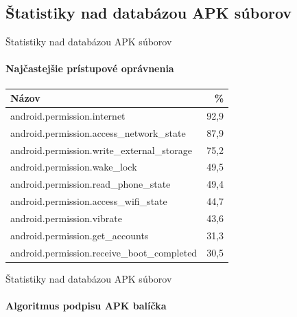 \documentclass{beamer}
\begin{document}
\subsection{Štatistiky nad databázou APK súborov}
  \begin{frame}[label=lists]{Štatistiky nad databázou APK súborov}
  \framesubtitle{Najčastejšie prístupové oprávnenia}
	 \begin{table}[!htbp]
\centering
  \begin{tabular}{l r}
    \textbf{Názov} & \textbf{\%} \\\hline
    android.permission.internet & 92,9 \\
    android.permission.access\_network\_state & 87,9 \\
    android.permission.write\_external\_storage & 75,2 \\
    android.permission.wake\_lock & 49,5 \\
    android.permission.read\_phone\_state & 49,4 \\
    android.permission.access\_wifi\_state & 44,7 \\
    android.permission.vibrate & 43,6 \\
    android.permission.get\_accounts & 31,3 \\
    android.permission.receive\_boot\_completed & 30,5 \\\hline
  \end{tabular}
  \label{tab:permissions}
\end{table}
  \end{frame} 
  
  
  \begin{frame}[label=lists]{Štatistiky nad databázou APK súborov}
  \framesubtitle{Algoritmus podpisu APK balíčka}
\begin{figure}[H]
\centering
\begin{bchart}[min=0,max=80,step=10,unit=\%]
\bcskip{6pt}
\bcskip{6pt}
\bcskip{6pt}
\bcskip{6pt}
\bcskip{6pt}
\bcskip{3pt}
\end{bchart}

\label{fig:signAlg}
\end{figure}
  \end{frame} 
\end{document}
